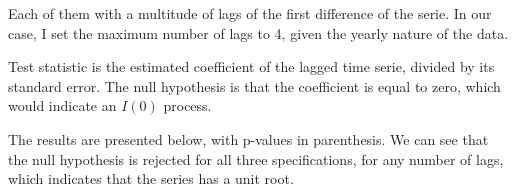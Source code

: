\documentclass[12pt]{article}
\begin{document}
Each of them with a multitude of lags of the first difference of the serie. In our case, I set the maximum number of lags to 4, given the yearly nature of the data.

Test statistic is the estimated coefficient of the lagged time serie, divided by its standard error. The null hypothesis is that the coefficient is equal to zero, which would indicate an $I(0)$ process.

The results are presented below, with p-values in parenthesis. We can see that the null hypothesis is rejected for all three specifications, for any number of lags, which indicates that the series has a unit root.


\end{document}
